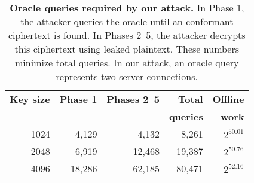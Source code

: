 \begin{table}[t]
\begin{tabular*}{\linewidth}{@{\extracolsep{\fill}\hskip\tabcolsep}rrrrr}
\toprule
\textbf{Key size}    & \textbf{Phase 1} & \textbf{Phases 2--5} & \textbf{Total}   & \textbf{Offline} \\
                     &                 &                 & \textbf{queries} & \textbf{work}    \\
\midrule
               1024 &  4,129   &  4,132  &  8,261 & $2^{50.01}$ \\

               2048 &  6,919   &  12,468 & 19,387 & $2^{50.76}$ \\

               4096 &  18,286  &  62,185 & 80,471 & $2^{52.16}$ \\
\bottomrule
\end{tabular*}
\caption{\textbf{Oracle queries required by our attack.} In Phase 1, the attacker queries the oracle until an \ssltwo conformant ciphertext is found.  In Phases 2--5, the attacker decrypts this ciphertext using leaked plaintext.  These numbers minimize total queries.  In our attack, an oracle query represents two server connections.}
\label{tab:optimal_queries}
\end{table}

